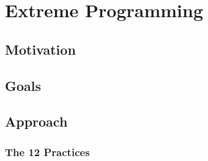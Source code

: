 \section{Extreme Programming}
\subsection{Motivation}
\subsection{Goals}
\subsection{Approach}
\subsubsection{The 12 Practices}
